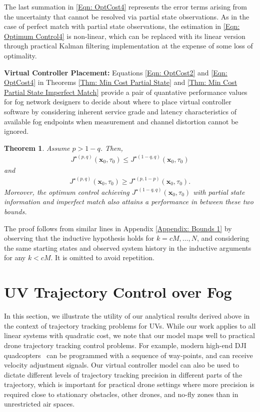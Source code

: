 \documentclass[10pt, journal, letterpaper]{IEEEtran}
\newcommand{\paren}[1]{\left(#1\right)}
\newcommand{\1}{\ensuremath{\mathbf{1}}} %
\newcommand{\mincost}[2]{\ensuremath{J^{\star\paren{#1, #2}}}\paren{\vec{x}_0, \tau_0}}
\renewcommand{\vec}[1]{\ensuremath{\boldsymbol{#1}}} %
\newtheorem{theorem}{Theorem}
\begin{document}
The last summation in \eqref{Eqn: OptCost4} represents the error terms arising from the uncertainty that cannot be resolved via partial state observations. As in the case of perfect match with partial state observations, the estimation in \eqref{Eqn: Optimum Control4} is non-linear, which can be replaced with its linear version through practical Kalman filtering implementation at the expense of some loss of optimality.

{\bf Virtual Controller Placement:} Equations \eqref{Eqn: OptCost2} and \eqref{Eqn: OptCost4} in Theorems \ref{Thm: Min Cost Partial State} and \ref{Thm: Min Cost Partial State Imperfect Match} provide a pair of quantative performance values for fog network designers to decide about where to place virtual controller software by considering inherent service grade and latency characteristics of available fog endpoints when measurement and channel distortion cannot be ignored.

\begin{theorem} \label{Thm: Min Cost Bounds4}
Assume $p > 1-q$. Then,
\begin{eqnarray*}
\mincost{p}{q} \leq \mincost{1-q}{q}
\end{eqnarray*}
and
\begin{eqnarray*}
\mincost{p}{q} \geq \mincost{p}{1-p}.
\end{eqnarray*}
Moreover, the optimum control achieving $\mincost{1-q}{q}$ with {\em partial} state information and {\em imperfect} match also attains a performance in between these two bounds.
\end{theorem}
\begin{IEEEproof}
The proof follows from similar lines in Appendix \ref{Appendix: Bounds 1} by observing that the inductive hypothesis holds for $k= cM, \ldots, N$, and considering the same starting states and observed system history in the inductive arguments for any $k < cM$. It is omitted to avoid repetition. \end{IEEEproof}

\section{UV Trajectory Control over Fog} \label{Section: Numerical Results}
In this section, we illustrate the utility of our analytical results derived above in the context of trajectory tracking problems for UVs. While our work applies to all linear systems with quadratic cost, we note that our model maps well to practical drone trajectory tracking control problems. For example, modern high-end DJI quadcopters~\cite{DJIMatrice2017} can be programmed with a sequence of way-points, and can receive velocity adjustment signals. Our virtual controller model can also be used to dictate different levels of trajectory tracking precision in different parts of the trajectory, which is important for practical drone settings where more precision is required close to stationary obstacles, other drones, and no-fly zones than in unrestricted air spaces.
\end{document}

